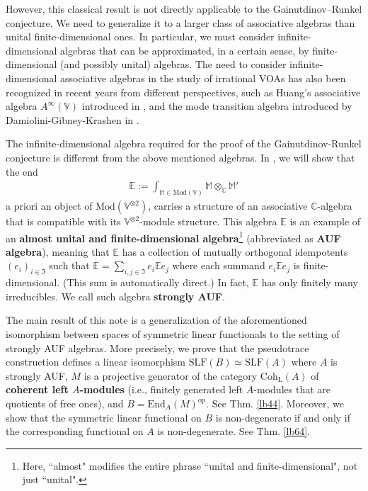 \documentclass[11pt,b5paper,notitlepage]{article}
\theoremstyle{definition}
\theoremstyle{plain}
\newcommand{\fk}{\mathfrak}
\newcommand{\End}{\mathrm{End}} %
\newcommand{\opp}{\mathrm{op}}
\newcommand{\Vbb}{\mathbb V}
\newcommand{\Mbb}{\mathbb M}
\newcommand{\Cbb}{\mathbb C}
\newcommand{\Ebb}{\mathbb E}
\newcommand{\Mod}{\mathrm{Mod}}
\newcommand{\dps}{\displaystyle}
\newcommand{\Coh}{\mathrm{Coh}_{\mathrm L}}
\newcommand{\SLF}{\mathrm{SLF}}
\numberwithin{equation}{section}
\begin{document}
However, this classical result is not directly applicable to the Gainutdinov–Runkel conjecture. We need to generalize it to a larger class of associative algebras than unital finite-dimensional ones. In particular, we must consider infinite-dimensional algebras that can be approximated, in a certain sense, by finite-dimensional (and possibly unital) algebras. The need to consider infinite-dimensional associative algebras in the study of irrational VOAs has also been recognized in recent years from different perspectives, such as Huang's associative algebra $A^\infty(\Vbb)$ introduced in \cite{Hua-associative}, and the mode transition algebra introduced by Damiolini-Gibney-Krashen in \cite{DGK2}.


The infinite-dimensional algebra required for the proof of the Gainutdinov-Runkel conjecture is different from the above mentioned algebras. In \cite{GZ5}, we will show that the end
\begin{align*}
\dps\Ebb:=\int_{\Mbb\in\Mod(\Vbb)}\Mbb\otimes_\Cbb\Mbb'
\end{align*}
a priori an object of $\Mod(\Vbb^{\otimes2})$, carries a structure of an associative $\Cbb$-algebra that is compatible with its $\Vbb^{\otimes2}$-module structure. This algebra $\Ebb$ is an example of an \textbf{almost unital and finite-dimensional algebra}\footnote{Here, ``almost" modifies the entire phrase ``unital and finite-dimensional", not just ``unital".} (abbreviated as \textbf{AUF algebra}), meaning that $\Ebb$ has a collection of mutually orthogonal idempotents $(e_i)_{i\in\fk I}$ such that $\Ebb=\sum_{i,j\in\fk I}e_i\Ebb e_j$ where each summand $e_i\Ebb e_j$ is finite-dimensional. (This sum is automatically direct.) In fact, $\Ebb$ has only finitely many irreducibles. We call such algebra \textbf{strongly AUF}.

The main result of this note is a generalization of the aforementioned isomorphism between spaces of symmetric linear functionals to the setting of strongly AUF algebras. More precisely, we prove that the pseudotrace construction defines a linear isomorphism $\SLF(B)\simeq\SLF(A)$ where $A$ is strongly AUF, $M$ is a projective generator of the category $\Coh(A)$ of \textbf{coherent left $A$-modules} (i.e., finitely generated left $A$-modules that are quotients of free ones), and $B=\End_A(M)^\opp$. See Thm. \ref{lb44}. Moreover, we show that the symmetric linear functional on $B$ is non-degenerate if and only if the corresponding functional on $A$ is non-degenerate. See Thm. \ref{lb64}.
\end{document}
